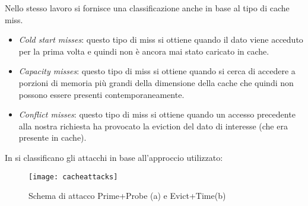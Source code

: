 			Nello stesso lavoro si fornisce una classificazione anche in base al tipo di cache miss. 
			
			\begin{itemize}
				\item \emph{Cold start misses}: questo tipo di miss si ottiene quando il dato viene acceduto per la prima volta e quindi non è ancora mai stato caricato in cache.
				\item \emph{Capacity misses}: questo tipo di miss si ottiene quando si cerca di accedere a porzioni di memoria più grandi della dimensione della cache che quindi non possono essere presenti contemporaneamente.
				\item \emph{Conflict misses}: questo tipo di miss si ottiene quando un accesso precedente alla nostra richiesta ha provocato la eviction del dato di interesse (che era presente in cache).
			\end{itemize}
			
			In \cite{lipp2016armageddon,ge2016survey} si classificano gli attacchi in base all'approccio utilizzato:
			
			\begin{figure}
				\begin{center}
					\texttt{[image: cacheattacks]}
					\caption{Schema di attacco Prime+Probe (a) e Evict+Time(b)}
					\label{fig:cacheattacks}
				\end{center}
			\end{figure}
			
